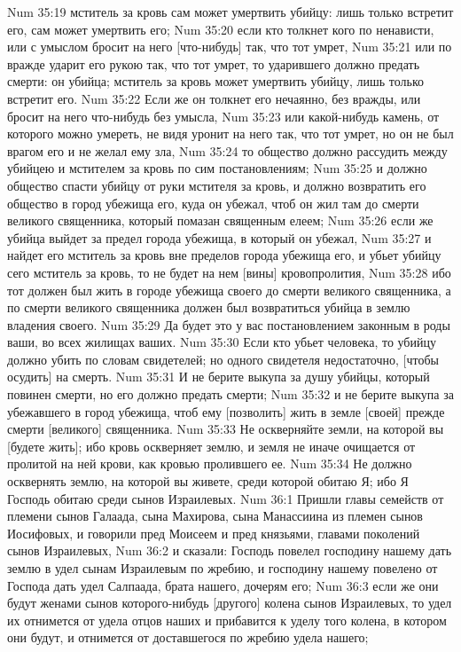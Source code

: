 Num 35:19  мститель за кровь сам может умертвить убийцу: лишь только встретит его, сам может умертвить его;
Num 35:20  если кто толкнет кого по ненависти, или с умыслом бросит на него [что-нибудь] так, что тот умрет,
Num 35:21  или по вражде ударит его рукою так, что тот умрет, то ударившего должно предать смерти: он убийца; мститель за кровь может умертвить убийцу, лишь только встретит его.
Num 35:22  Если же он толкнет его нечаянно, без вражды, или бросит на него что-нибудь без умысла,
Num 35:23  или какой-нибудь камень, от которого можно умереть, не видя уронит на него так, что тот умрет, но он не был врагом его и не желал ему зла,
Num 35:24  то общество должно рассудить между убийцею и мстителем за кровь по сим постановлениям;
Num 35:25  и должно общество спасти убийцу от руки мстителя за кровь, и должно возвратить его общество в город убежища его, куда он убежал, чтоб он жил там до смерти великого священника, который помазан священным елеем;
Num 35:26  если же убийца выйдет за предел города убежища, в который он убежал,
Num 35:27  и найдет его мститель за кровь вне пределов города убежища его, и убьет убийцу сего мститель за кровь, то не будет на нем [вины] кровопролития,
Num 35:28  ибо тот должен был жить в городе убежища своего до смерти великого священника, а по смерти великого священника должен был возвратиться убийца в землю владения своего.
Num 35:29  Да будет это у вас постановлением законным в роды ваши, во всех жилищах ваших.
Num 35:30  Если кто убьет человека, то убийцу должно убить по словам свидетелей; но одного свидетеля недостаточно, [чтобы осудить] на смерть.
Num 35:31  И не берите выкупа за душу убийцы, который повинен смерти, но его должно предать смерти;
Num 35:32  и не берите выкупа за убежавшего в город убежища, чтоб ему [позволить] жить в земле [своей] прежде смерти [великого] священника.
Num 35:33  Не оскверняйте земли, на которой вы [будете жить]; ибо кровь оскверняет землю, и земля не иначе очищается от пролитой на ней крови, как кровью пролившего ее.
Num 35:34  Не должно осквернять землю, на которой вы живете, среди которой обитаю Я; ибо Я Господь обитаю среди сынов Израилевых.
Num 36:1  Пришли главы семейств от племени сынов Галаада, сына Махирова, сына Манассиина из племен сынов Иосифовых, и говорили пред Моисеем и пред князьями, главами поколений сынов Израилевых,
Num 36:2  и сказали: Господь повелел господину нашему дать землю в удел сынам Израилевым по жребию, и господину нашему повелено от Господа дать удел Салпаада, брата нашего, дочерям его;
Num 36:3  если же они будут женами сынов которого-нибудь [другого] колена сынов Израилевых, то удел их отнимется от удела отцов наших и прибавится к уделу того колена, в котором они будут, и отнимется от доставшегося по жребию удела нашего;
